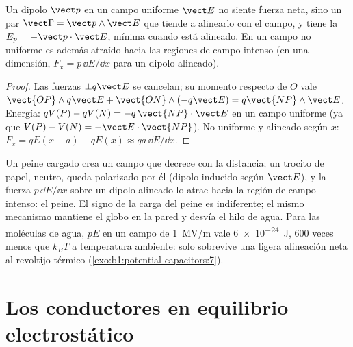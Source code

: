 \begin{proposition}\label{prop:b1:potential-capacitors:dipoleinfield}
Un dipolo $\vect p$ en un campo uniforme $\vect E$ no siente fuerza neta,
sino un par $\vect\Gamma = \vect p\wedge\vect E$ que tiende a alinearlo
con el campo, y tiene la  $E_p = -\vect p\cdot\vect E$,
mínima cuando está alineado. En un campo no uniforme es además atraído
hacia las regiones de campo intenso (en una dimensión, $F_x = p\,\dd E/\dd x$
para un dipolo alineado).
\end{proposition}

\begin{proof}
Las fuerzas $\pm q\vect E$ se cancelan; su momento respecto de $O$ vale
$\vect{OP}\wedge
q\vect E + \vect{ON}\wedge(-q\vect E) = q\vect{NP}\wedge\vect E$. Energía:
$qV(P) - qV(N) = -q\,\vect{NP}\cdot\vect E$ en un campo uniforme (ya que $V(P)
- V(N) = -\vect E\cdot\vect{NP}$). No uniforme y alineado según $x$: $F_x =
qE(x + a) - qE(x) \approx qa\,\dd E/\dd x$.
\end{proof}

\begin{example}\label{ex:b1:potential-capacitors:comb}
Un peine cargado crea un campo que decrece con la distancia; un trocito
de papel, neutro, queda polarizado por él (dipolo inducido según
$\vect E$), y la fuerza $p\,\dd E/\dd x$ sobre un dipolo alineado lo atrae
hacia la región de campo intenso: el peine. El signo de la carga del
peine es indiferente; el mismo mecanismo mantiene el globo en la pared y
desvía el hilo de agua. Para las moléculas de agua, $pE$ en un campo de
\qty{1}{MV/m} vale \qty{6e-24}{J}, $600$ veces menos que $k_BT$ a
temperatura ambiente: solo sobrevive una ligera alineación neta al
revoltijo térmico (\cref{exo:b1:potential-capacitors:7}).
\end{example}

\section{Los conductores en equilibrio electrostático}

